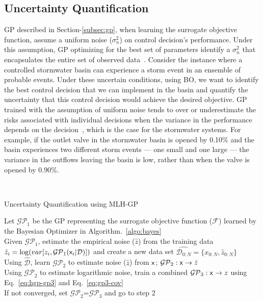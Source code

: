 \subsection{Uncertainty Quantification}
GP described in Section-\ref{subsec:gp}, when learning the surrogate objective function, assume a uniform noise ($\sigma^2_n$) on control decision's performance.
Under this assumption, GP optimizing for the best set of parameters identify a $\sigma^2_n$ that encapsulates the entire set of observed data~\cite{rasmussenGaussianProcessesMachine2006, Kersting_Plagemann_Pfaff_Burgard_2007}.
Consider the instance where a controlled stormwater basin can experience a storm event in an ensemble of probable events.
Under these uncertain conditions, using BO, we want to identify the best control decision that we can implement in the basin and quantify the uncertainty that this control decision would achieve the desired objective.
GP trained with the assumption of uniform noise tends to over or underestimate the risks associated with individual decisions when the variance in the performance depends on the decision~\cite{Kersting_Plagemann_Pfaff_Burgard_2007}, which is the case for the stormwater systems.
For example, if the outlet valve in the stormwater basin is opened by 0.10\% and the basin experiences two different storm events --- one small and one large --- the variance in the outflows leaving the basin is low, rather than when the valve is opened by 0.90\%.

\
\begin{algorithm}
\caption{Uncertainty Quantification using MLH-GP}\label{algo:hetrosodastic-GP}
Let $\mathcal{GP}_1$ be the GP representing the surrogate objective function ($\mathcal{F}$) learned by the Bayesian Optimizer in Algorithm.~\ref{algo:bayes}\\
Given $\mathcal{GP}_1$, estimate the empirical noise ($\hat{z}$) from the training data $\hat{z}_i = \log(var[z_i, \mathcal{GP}_1({\mathsf{x}}_i|\mathcal{D})])$ and create a new data set $\hat{\mathcal{D}_{0:N}} = \{ x_{0:N}, \hat{z}_{0:N} \}$ \\
Using $\hat{\mathcal{D}}$, learn $\mathcal{GP}_2$ to estimate noise ($\hat{z}$) from ${\mathsf{x}}$; $\mathcal{GP}_2: {\mathsf{x}} \rightarrow \hat{z}$ \\
Using $\mathcal{GP}_2$ to estimate logarithmic noise, train a combined $\mathcal{GP}_3: {\mathsf{x}} \rightarrow z$ using Eq.~\ref{eq:hgp-gp3} and Eq.~\ref{eq:gp3-cov}\\
If not converged, set $\mathcal{GP}_2$=$\mathcal{GP}_3$ and go to step 2 \\
\end{algorithm}


